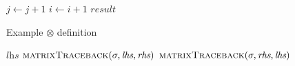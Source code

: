 \documentclass{bmcart}
\newcommand*\NonNegReals{\mathbb{R}_{\geq 0}}
\begin{document}
\begin{backmatter}
\begin{algorithm}
\begin{algorithmic}[1]
    		
    		
    		\State $\textit{j} \gets \textit{j} + 1$
    		\EndIf
    		\State $\textit{i} \gets \textit{i} + 1$
    		\EndFor
    		\Return $\textit{result}$
    		\EndFunction
    	\end{algorithmic}
    \end{algorithm}


	
	
	\begin{algorithm}
		\caption{Example $\otimes$ definition}\label{Alg:pairwiseAlignment}
		\begin{algorithmic}[1]
			\Ensure{($\NonNegReals$, $\Sigma_{\Gamma}^{*}$)}
			\newline
			\State \Return $\textit{lhs}$
			\State \Return $\Call{matrixTraceback}{\sigma, \textit{lhs}, \textit{rhs}}$
			\Else
			\State \Return $\Call{matrixTraceback}{\sigma, \textit{rhs}, \textit{lhs}}$
			\EndIf
			\EndFunction
		\end{algorithmic}
	\end{algorithm}
	

\end{backmatter}
\end{document}
